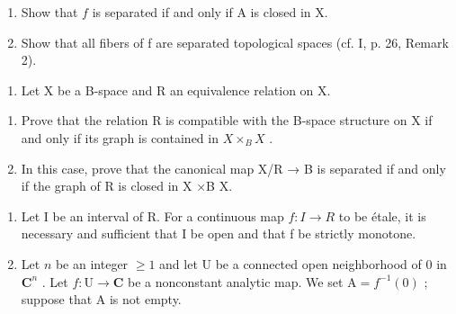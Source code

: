 \begin{enumerate}
\def\labelenumi{\alph{enumi})}
\item
  Show that \(f\) is separated if and only if A is closed in X.
\item
  Show that all fibers of f are separated topological spaces (cf. I, p. 26, Remark 2).
\end{enumerate}

\begin{enumerate}
\def\labelenumi{\arabic{enumi})}
\setcounter{enumi}{1}
\tightlist
\item
  Let X be a B-space and R an equivalence relation on X.
\end{enumerate}

\begin{enumerate}
\def\labelenumi{\alph{enumi})}
\item
  Prove that the relation R is compatible with the B-space structure on X if and only if its graph is contained in \(X \times_{B} X\) .
\item
  In this case, prove that the canonical map X/R → B is separated if and only if the graph of R is closed in X ×B X.
\end{enumerate}

\begin{enumerate}
\def\labelenumi{\arabic{enumi})}
\setcounter{enumi}{2}
\item
  Let I be an interval of R. For a continuous map \(f: I \rightarrow R\) to be étale, it is necessary and sufficient that I be open and that f be strictly monotone.
\item
  Let \(n\) be an integer \(\geqslant 1\) and let U be a connected open neighborhood of 0 in \(\mathbf{C}^n\) . Let \(f: \mathrm{U} \to \mathbf{C}\) be a nonconstant analytic map. We set \(\mathrm{A} = f^{-1}(0)\) ; suppose that A is not empty.
\end{enumerate}


